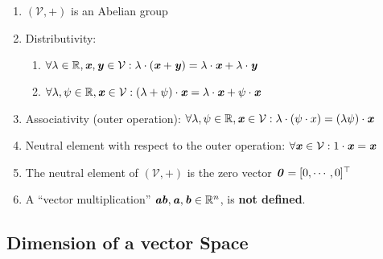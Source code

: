 \begin{enumerate}
    \item $(\mathcal{V}, +)$ is an Abelian group
    \hfill \cite{mfml/book/mml/Deisenroth-Faisal-Ong}

    \item Distributivity:
    \begin{enumerate}
        \item $\forall \lambda  \in  \mathbb{R}, \text{\textbf{\textit{x}}}, \text{\textbf{\textit{y}}} \in  \mathcal{V} : \lambda  \cdot  (\text{\textbf{\textit{x}}} + \text{\textbf{\textit{y}}}) = \lambda  \cdot  \text{\textbf{\textit{x}}} + \lambda  \cdot  \text{\textbf{\textit{y}}}$
        \hfill \cite{mfml/book/mml/Deisenroth-Faisal-Ong}

        \item $\forall \lambda , \psi  \in  \mathbb{R}, \text{\textbf{\textit{x}}} \in  \mathcal{V} : (\lambda  + \psi ) \cdot  \text{\textbf{\textit{x}}} = \lambda  \cdot  \text{\textbf{\textit{x}}} + \psi  \cdot  \text{\textbf{\textit{x}}}$
        \hfill \cite{mfml/book/mml/Deisenroth-Faisal-Ong}
    \end{enumerate}

    \item Associativity (outer operation): $\forall \lambda , \psi  \in  \mathbb{R}, \text{\textbf{\textit{x}}} \in  \mathcal{V} : \lambda \cdot (\psi \cdot x) = (\lambda \psi )\cdot \text{\textbf{\textit{x}}}$
    \hfill \cite{mfml/book/mml/Deisenroth-Faisal-Ong}

    \item Neutral element with respect to the outer operation: $\forall \text{\textbf{\textit{x}}} \in  \mathcal{V} : 1\cdot \text{\textbf{\textit{x}}} = \text{\textbf{\textit{x}}}$
    \hfill \cite{mfml/book/mml/Deisenroth-Faisal-Ong}

    \item The neutral element of $(\mathcal{V}, +)$ is the zero vector $\text{\textbf{\textit{0}}} = [0, \cdots , 0]^\top$
    \hfill \cite{mfml/book/mml/Deisenroth-Faisal-Ong}

    \item A “vector multiplication” $\text{\textbf{\textit{ab}}}, \text{\textbf{\textit{a}}}, \text{\textbf{\textit{b}}} \in \mathbb{R}^n$, is \textbf{not defined}.
    \hfill \cite{mfml/book/mml/Deisenroth-Faisal-Ong}
\end{enumerate}


\subsection{Dimension of a vector Space}


